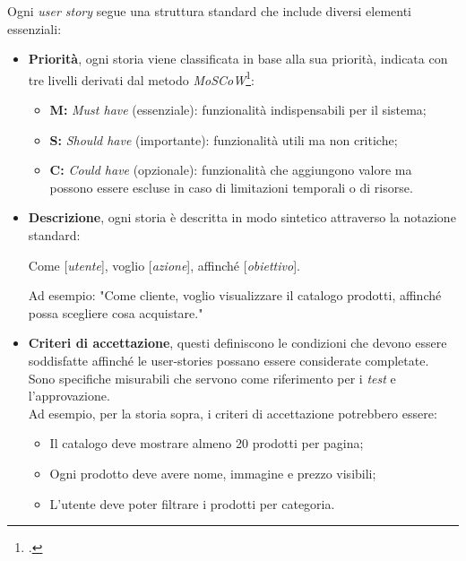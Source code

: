 \noindent Ogni \textit{user story} segue una struttura standard che include diversi elementi essenziali:\\
\begin{itemize}

    \item \textbf{Priorità}, ogni storia viene classificata in base alla sua priorità, indicata con tre livelli derivati dal metodo \textit{MoSCoW}\footcite{site:moscow-method}:
    \begin{itemize}
        \item \textbf{M:} \textit{Must have} (essenziale): funzionalità indispensabili per il sistema;
        \item \textbf{S:} \textit{Should have} (importante): funzionalità utili ma non critiche;
        \item \textbf{C:} \textit{Could have} (opzionale): funzionalità che aggiungono valore ma possono essere escluse in caso di limitazioni temporali o di risorse.   
    \end{itemize}

    \item \textbf{Descrizione}, ogni storia è descritta in modo sintetico attraverso la notazione standard:

    \begin{center}
        Come [\textit{utente}], voglio [\textit{azione}], affinché [\textit{obiettivo}].
    \end{center}
    Ad esempio: "Come cliente, voglio visualizzare il catalogo prodotti, affinché possa scegliere cosa acquistare."\\

    \item \textbf{Criteri di accettazione}, questi definiscono le condizioni che devono essere soddisfatte affinché le \gls{user-stories} possano essere considerate completate.\\
    Sono specifiche misurabili che servono come riferimento per i \textit{test} e l’approvazione. \\

    \noindent Ad esempio, per la storia sopra, i criteri di accettazione potrebbero essere:

    \begin{itemize}
        \item Il catalogo deve mostrare almeno 20 prodotti per pagina;
        \item Ogni prodotto deve avere nome, immagine e prezzo visibili;
        \item L’utente deve poter filtrare i prodotti per categoria.
    \end{itemize}

\end{itemize}

